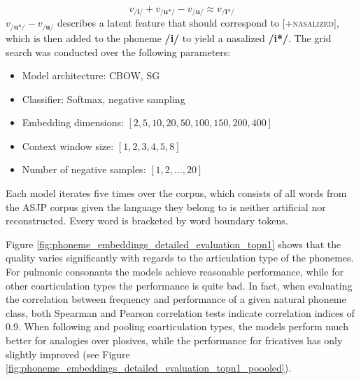 \documentclass[6pt]{article}
\begin{document}
\begin{equation}
v_{\textbf{/i/} } + v_{\textbf{/u*/} } -  v_{\textbf{/u/} } \approx v_{\textbf{/i*/} }
\end{equation}
$v_{\textbf{/u*/} } -  v_{\textbf{/u/} }$ describes a latent feature that should correspond to \textsc{[+nasalized]}, which is then added to the phoneme \textbf{/i/} to yield a nasalized \textbf{/i*/}.
The grid search was conducted over the following parameters:
\begin{itemize}
\item Model architecture: CBOW, SG
\item Classifier: Softmax, negative sampling
\item Embedding dimensions: $[2, 5,10, 20, 50, 100, 150, 200, 400 ]$
\item Context window size: $[1,2,3,4,5,8]$
\item Number of negative samples: $[1,2, ..., 20]$
\end{itemize}
 Each model iterates five times over the corpus, which consists of all words from the ASJP corpus given the language they belong to is neither artificial nor reconstructed. Every word is bracketed by word boundary tokens.


Figure \ref{fig:phoneme_embeddings_detailed_evaluation_topn1} shows that the quality varies significantly with regards to the articulation type of the phonemes. For pulmonic consonants the models achieve reasonable performance, while for other coarticulation types the performance is quite bad. In fact, when evaluating the correlation between frequency and performance of a given natural phoneme class, both Spearman and Pearson correlation tests indicate correlation indices of 0.9. When following \cite{jager2014phylogenetic,rama2016siamese} and pooling coarticulation types, the models perform much better for analogies over plosives, while the performance for fricatives has only slightly improved (see Figure \ref{fig:phoneme_embeddings_detailed_evaluation_topn1_poooled}). 
\end{document}
